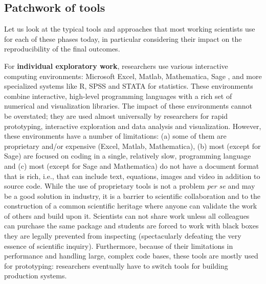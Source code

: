 \documentclass[ChapterTOCs,krantz2]{krantz} %
\begin{document}
\subsection{Patchwork of tools}

Let us look at the typical tools and approaches that most working scientists
use for each of these phases today, in particular considering their impact on
the reproducibility of the final outcomes. 

For \textbf{individual exploratory work}, researchers use various interactive
computing environments: Microsoft Excel, Matlab, Mathematica, Sage \cite{sage},
and more specialized systems like R, SPSS and STATA for statistics. These
environments combine interactive, high-level programming languages with a rich
set of numerical and visualization libraries. The impact of these environments
cannot be overstated; they are used almost universally by researchers for rapid
prototyping, interactive exploration and data analysis and
visualization. However, these environments have a number of limitations: (a)
some of them are proprietary and/or expensive (Excel, Matlab, Mathematica), (b)
most (except for Sage) are focused on coding in a single, relatively slow,
programming language and (c) most (except for Sage and Mathematica) do not have
a document format that is rich, i.e., that can include text, equations, images
and video in addition to source code. While the use of proprietary tools is not
a problem \emph{per se} and may be a good solution in industry, it is a barrier
to scientific collaboration and to the construction of a common scientific
heritage where anyone can validate the work of others and build upon it.
Scientists can not share work unless all colleagues can purchase the same package
and students are forced to work with black boxes they are legally prevented
from inspecting (spectacularly defeating the very essence of scientific
inquiry). Furthermore, because of their limitations in performance and handling
large, complex code bases, these tools are mostly used for prototyping:
researchers eventually have to switch tools for building production systems.
\end{document}
